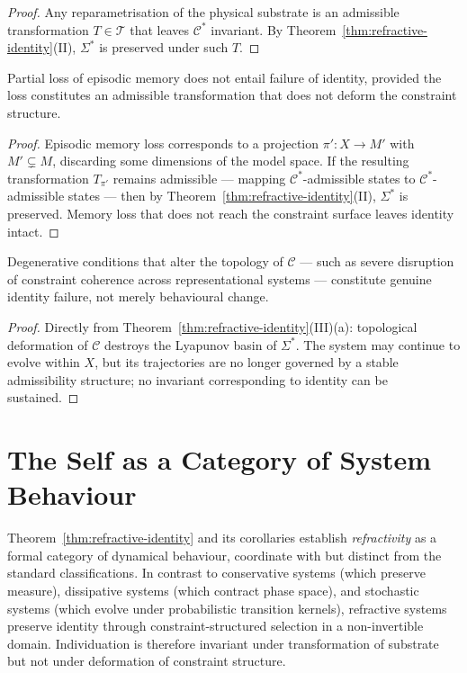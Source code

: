 \documentclass[11pt,openany]{book}
\begin{document}
\begin{proof}
Any reparametrisation of the physical substrate is an
admissible transformation $T \in \mathcal{T}$ that leaves
$\mathcal{C}^*$ invariant.  By
Theorem~\ref{thm:refractive-identity}(II), $\Sigma^*$ is
preserved under such $T$.
\end{proof}

\begin{corollary}
\label{cor:memory}
Partial loss of episodic memory does not entail failure of
identity, provided the loss constitutes an admissible
transformation that does not deform the constraint
structure.
\end{corollary}

\begin{proof}
Episodic memory loss corresponds to a projection
$\pi' : X \to M'$ with $M' \subsetneq M$, discarding some
dimensions of the model space.  If the resulting
transformation $T_{\pi'}$ remains admissible --- mapping
$\mathcal{C}^*$-admissible states to
$\mathcal{C}^*$-admissible states --- then by
Theorem~\ref{thm:refractive-identity}(II), $\Sigma^*$ is
preserved.  Memory loss that does not reach the constraint
surface leaves identity intact.
\end{proof}

\begin{corollary}
\label{cor:failure}
Degenerative conditions that alter the topology of
$\mathcal{C}$ --- such as severe disruption of constraint
coherence across representational systems --- constitute
genuine identity failure, not merely behavioural change.
\end{corollary}

\begin{proof}
Directly from Theorem~\ref{thm:refractive-identity}(III)(a):
topological deformation of $\mathcal{C}$ destroys the
Lyapunov basin of $\Sigma^*$.  The system may continue to
evolve within $X$, but its trajectories are no longer
governed by a stable admissibility structure; no invariant
corresponding to identity can be sustained.
\end{proof}

\section{The Self as a Category of System Behaviour}
\label{sec:category}

Theorem~\ref{thm:refractive-identity} and its corollaries
establish \emph{refractivity} as a formal category of
dynamical behaviour, coordinate with but distinct from the
standard classifications.  In contrast to conservative
systems (which preserve measure), dissipative systems (which
contract phase space), and stochastic systems (which evolve
under probabilistic transition kernels), refractive systems
preserve identity through constraint-structured selection in
a non-invertible domain.  Individuation is therefore
invariant under transformation of substrate but not under
deformation of constraint structure.
\end{document}
